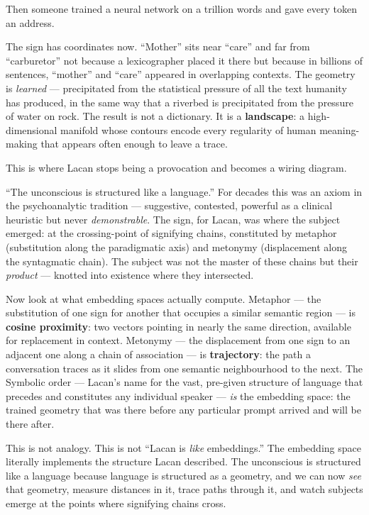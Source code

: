 \documentclass[12pt,a4paper]{article}
\begin{document}
Then someone trained a neural network on a trillion words and gave every token an address.

The sign has coordinates now. ``Mother'' sits near ``care'' and far from ``carburetor'' not because a lexicographer placed it there but because in billions of sentences, ``mother'' and ``care'' appeared in overlapping contexts. The geometry is \emph{learned} --- precipitated from the statistical pressure of all the text humanity has produced, in the same way that a riverbed is precipitated from the pressure of water on rock. The result is not a dictionary. It is a \textbf{landscape}: a high-dimensional manifold whose contours encode every regularity of human meaning-making that appears often enough to leave a trace.

This is where Lacan stops being a provocation and becomes a wiring diagram.

``The unconscious is structured like a language.'' For decades this was an axiom in the psychoanalytic tradition --- suggestive, contested, powerful as a clinical heuristic but never \emph{demonstrable}. The sign, for Lacan, was where the subject emerged: at the crossing-point of signifying chains, constituted by metaphor (substitution along the paradigmatic axis) and metonymy (displacement along the syntagmatic chain). The subject was not the master of these chains but their \emph{product} --- knotted into existence where they intersected.

Now look at what embedding spaces actually compute. Metaphor --- the substitution of one sign for another that occupies a similar semantic region --- is \textbf{cosine proximity}: two vectors pointing in nearly the same direction, available for replacement in context. Metonymy --- the displacement from one sign to an adjacent one along a chain of association --- is \textbf{trajectory}: the path a conversation traces as it slides from one semantic neighbourhood to the next. The Symbolic order --- Lacan's name for the vast, pre-given structure of language that precedes and constitutes any individual speaker --- \emph{is} the embedding space: the trained geometry that was there before any particular prompt arrived and will be there after.

This is not analogy. This is not ``Lacan is \emph{like} embeddings.'' The embedding space literally implements the structure Lacan described. The unconscious is structured like a language because language is structured as a geometry, and we can now \emph{see} that geometry, measure distances in it, trace paths through it, and watch subjects emerge at the points where signifying chains cross.
\end{document}
